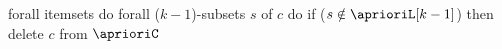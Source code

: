 forall itemsets do
	forall ($k-1$)-subsets $s$ of $c$ do
		if ($s \notin \aprioriL[k-1]$) then
			delete $c$ from $\aprioriC$